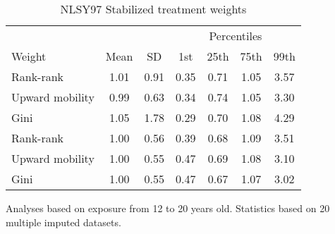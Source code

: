 \begin{table}[htp]
\centering
\footnotesize
\setlength{\tabcolsep}{10pt}
\renewcommand{\arraystretch}{1}
\begin{threeparttable}
\centering
\caption{NLSY97 Stabilized treatment weights} 
\label{tab:nlsy97_ipt_weigths_raw}
\begin{tabular}{lcccccc}
  \hline
\multicolumn{3}{c}{} & \multicolumn{4}{c}{Percentiles} \\ 
 \cmidrule{4-7} 
Weight & Mean & SD & 1st & 25th & 75th & 99th \\ 
  \hline
\quad Rank-rank & 1.01 & 0.91 & 0.35 & 0.71 & 1.05 & 3.57 \\ 
  \quad Upward mobility & 0.99 & 0.63 & 0.34 & 0.74 & 1.05 & 3.30 \\ 
  \quad Gini & 1.05 & 1.78 & 0.29 & 0.70 & 1.08 & 4.29 \\ 
  \quad Rank-rank & 1.00 & 0.56 & 0.39 & 0.68 & 1.09 & 3.51 \\ 
  \quad Upward mobility & 1.00 & 0.55 & 0.47 & 0.69 & 1.08 & 3.10 \\ 
  \quad Gini & 1.00 & 0.55 & 0.47 & 0.67 & 1.07 & 3.02 \\ 
   \hline
\end{tabular}
\begin{tablenotes}
\footnotesize
\item Analyses based on exposure from 12 to 20 years old. Statistics based on  20 multiple imputed datasets.
\end{tablenotes}
\end{threeparttable}
\end{table}
